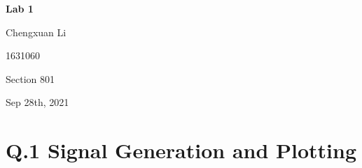 \documentclass{article}
\begin{document}
	\begin{titlepage}
		\begin{center}
			\vspace*{1cm}
		
			\textbf{Lab 1}
			
			\vspace{0.5cm}
			Chengxuan Li
			
			\vspace{0.1cm}
			1631060
			
			\vspace{0.1cm}
			Section 801
			
			\vspace{0.1cm}
			Sep 28th, 2021
		\end{center}
	\end{titlepage}
	
	\section*{Q.1 Signal Generation and Plotting}
\end{document}

